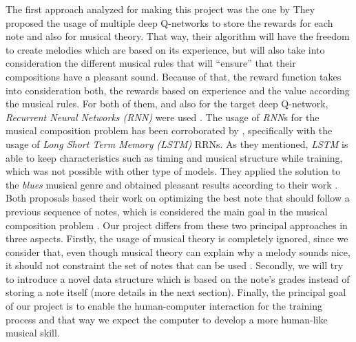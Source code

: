 The first approach analyzed for making this project was the one by \citeauthor{deeprl2016music} They proposed the usage of multiple deep Q-networks to store the rewards for each note and also for musical theory. That way, their algorithm will have the freedom to create melodies which are based on its experience, but will also take into consideration the different musical rules that will ``ensure'' that their compositions have a pleasant sound. Because of that, the reward function takes into consideration both, the rewards based on experience and the value according the musical rules. For both of them, and also for the target deep Q-network, \emph{Recurrent Neural Networks (RNN)} were used \cite{deeprl2016music}. The usage of \emph{RNN}s for the musical composition problem has been corroborated by \citeauthor{eck2002blues}, specifically with the usage of \emph{Long Short Term Memory (LSTM)} RRNs. As they mentioned, \emph{LSTM} is able to keep characteristics such as timing and musical structure while training, which was not possible with other type of models. They applied the solution to the \emph{blues} musical genre and obtained pleasant results according to their work \cite{eck2002blues}. Both proposals based their work on optimizing the best note that should follow a previous sequence of notes, which is considered the main goal in the musical composition problem \cite{connectionist1989}. Our project differs from these two principal approaches in three aspects. Firstly, the usage of musical theory is completely ignored, since we consider that, even though musical theory can explain why a melody sounds nice, it should not constraint the set of notes that can be used \cite{vilchez2015genetic} \cite{biles2013lessons}. Secondly, we will try to introduce a novel data structure which is based on the note's grades instead of storing a note itself (more details in the next section). Finally, the principal goal of our project is to enable the human-computer interaction for the training process and that way we expect the computer to develop a more human-like musical skill.